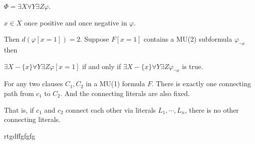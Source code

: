 $\Phi=\exists X\forall Y\exists Z \varphi$.

$x\in X$ once positive and once negative in $\varphi$.

Then $d(\varphi[x=1])=2$. Suppose $F[x=1]$ contains a MU(2) subformula $\varphi_{\neg x}$ then

$\exists X-\{x\}\forall Y\exists Z\varphi[x=1]$ if and only if $\exists X-\{x\}\forall Y\exists Z \varphi_{\neg x}$ is true.


For any two clauses $C_1, C_2$ in a MU(1) formula $F$. There is exactly one connecting path from $c_1$ to $C_2$. And the connecting literals are also fixed.

That is, if $c_1$ and $c_2$ connect each other via literals $L_1,\cdots, L_n$, there is no other connecting literals.




rtgdffgfgfg